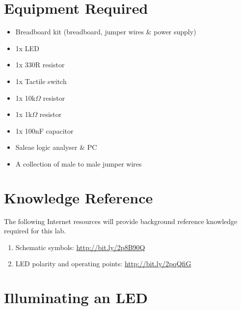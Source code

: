 \documentclass{UoNMCHA}
\numberwithin{equation}{section}
\begin{document}
\section{Equipment Required}
\begin{itemize}
    \item Breadboard kit (breadboard, jumper wires \& power supply)
    \item 1x LED
    \item 1x 330R resistor
    \item 1x Tactile switch
    \item 1x 10k$\Omega$ resistor
    \item 1x 1k$\Omega$ resistor
    \item 1x 100nF capacitor 
    \item Saleae logic analyser \& PC
    \item A collection of male to male jumper wires
\end{itemize}

\section{Knowledge Reference}
The following Internet resources will provide background reference knowledge required for this lab.
\begin{enumerate}
    \item Schematic symbols: \url{http://bit.ly/2p8B90Q}
    \item LED polarity and operating points: \url{http://bit.ly/2pqQfiG}
\end{enumerate}

\section{Illuminating an LED}
\end{document}
